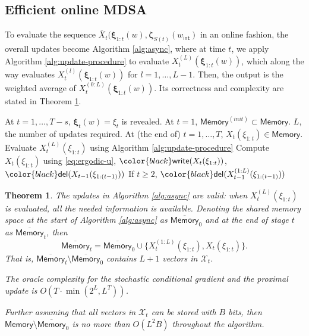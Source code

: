 \documentclass[11pt,fullpage,letterpaper]{article}
\newcommand{\mc}{\mathcal}
\newcommand{\bx}{\boldsymbol{\xi}}
\newcommand{\bz}{\boldsymbol{\zeta}}
\newcommand{\internal}{\mathsf{int}}
\newcommand{\memo}{\mathsf{Memory}}
\newcommand{\ww}[1]{{\color{black}\mathsf{write}(#1)}}
\newcommand{\del}[1]{{\color{black}\mathsf{del}(#1)}}
\newtheorem{theorem}{Theorem}[section]
\begin{document}
\subsection{Efficient online MDSA}\label{sec:online_MDSA}

To evaluate the sequence $\overline{X}_t(\bx_{1:t}(w),\bz_{S(t)}(w_{\internal})$ in an online fashion, the overall updates become Algorithm \ref{alg:async}, where at time $t$, we apply Algorithm \ref{alg:update-procedure} to evaluate $X^{(L)}_t(\bx_{1:t}(w))$, which along the way evaluates ${X}^{(l)}_t(\bx_{1:t}(w))$ for $l=1,\ldots,L-1$. Then, the output is the weighted average of ${X}^{(0:L)}_t(\bx_{1:t}(w))$. Its correctness and complexity are stated in Theorem \ref{thm:main-async}. 

\begin{algorithm}
\caption{Efficient online MDSA}\label{alg:async}
\begin{algorithmic}
\Require At $t=1,\ldots,T-s$, $\bx_t(w) = \xi_t$ is revealed. At $t=1$, $\memo^{(init)}\subset \memo$. $L$, the number of updates required. 
\Ensure At (the end of) $t = 1,\ldots,T$, $X_t(\xi_{1:t})\in \memo$.
\State Evaluate $X_t^{(L)}(\xi_{1:t})$ using Algorithm \ref{alg:update-procedure}
\State Compute $X_t(\xi_{1:t})$ using \eqref{eq:ergodic-u}, $\ww{X_t(\xi_{1:t})}$, $\del{X_{t-1}(\xi_{1:(t-1)})}$
\State If $t\geq 2$, $\del{X_{t-1}^{(1:L)}(\xi_{1:(t-1)})}$
\EndFor
\end{algorithmic}
\end{algorithm}


\begin{theorem}\label{thm:main-async}
The updates in Algorithm \ref{alg:async} are valid: when $X_t^{(L)}(\xi_{1:t})$ is evaluated, all the needed information is available. Denoting the shared memory space at the start of Algorithm \ref{alg:async} as $\overline{\memo}_0$ and at the end of stage $t$ as $\overline{\memo}_t$, then 
\begin{equation}\label{eq:memo_update}
    \overline{\memo}_t= \overline{\memo}_0\cup \{X_{t}^{(1:L)}(\xi_{1:t}), X_t(\xi_{1:t})\}.
\end{equation}
That is, $\overline{\memo}_t\setminus\overline{\memo}_0$ contains $L+1$ vectors in $\mc X_t$. 

The oracle complexity for the stochastic conditional gradient and the proximal update is $O(T \cdot \min(2^L,L^T))$.

Further assuming that all vectors in $\mc X_t$ can be stored with $B$ bits, then $\memo\setminus\overline{\memo}_0$ is no more than $O(L^2B)$ throughout the algorithm.

\end{theorem}
\end{document}
